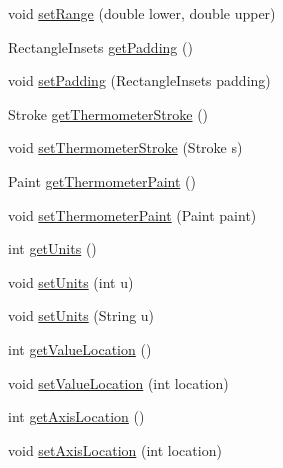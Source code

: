 \begin{DoxyCompactItemize}
void \mbox{\hyperlink{classorg_1_1jfree_1_1chart_1_1plot_1_1_thermometer_plot_aea60c0178fc6d469fe63bbf5fadf4c4c}{set\+Range}} (double lower, double upper)
\item 
Rectangle\+Insets \mbox{\hyperlink{classorg_1_1jfree_1_1chart_1_1plot_1_1_thermometer_plot_ae13b7526bb60e9b130430b510bd39d49}{get\+Padding}} ()
\item 
void \mbox{\hyperlink{classorg_1_1jfree_1_1chart_1_1plot_1_1_thermometer_plot_aca84c9a7372af7b31ae1845629f22c15}{set\+Padding}} (Rectangle\+Insets padding)
\item 
Stroke \mbox{\hyperlink{classorg_1_1jfree_1_1chart_1_1plot_1_1_thermometer_plot_a88292665456e7753129e4fa88053ef07}{get\+Thermometer\+Stroke}} ()
\item 
void \mbox{\hyperlink{classorg_1_1jfree_1_1chart_1_1plot_1_1_thermometer_plot_aaa2d0470bf85ee2eee9ea9e7568d919b}{set\+Thermometer\+Stroke}} (Stroke s)
\item 
Paint \mbox{\hyperlink{classorg_1_1jfree_1_1chart_1_1plot_1_1_thermometer_plot_ac725954b0973477c957c51b0e359fcda}{get\+Thermometer\+Paint}} ()
\item 
void \mbox{\hyperlink{classorg_1_1jfree_1_1chart_1_1plot_1_1_thermometer_plot_a3d8ade5824212540094354b9794b0dba}{set\+Thermometer\+Paint}} (Paint paint)
\item 
int \mbox{\hyperlink{classorg_1_1jfree_1_1chart_1_1plot_1_1_thermometer_plot_a69a0570b65093596ac626a988a3bcdbf}{get\+Units}} ()
\item 
void \mbox{\hyperlink{classorg_1_1jfree_1_1chart_1_1plot_1_1_thermometer_plot_a854875ffe9c0e66313089d022effdd44}{set\+Units}} (int u)
\item 
void \mbox{\hyperlink{classorg_1_1jfree_1_1chart_1_1plot_1_1_thermometer_plot_a510997aa0dd8f93a502f50fa1e197bde}{set\+Units}} (String u)
\item 
int \mbox{\hyperlink{classorg_1_1jfree_1_1chart_1_1plot_1_1_thermometer_plot_af9f80a7ccdea70b850b1383f078f25f0}{get\+Value\+Location}} ()
\item 
void \mbox{\hyperlink{classorg_1_1jfree_1_1chart_1_1plot_1_1_thermometer_plot_a2fadf1eca00d2d862890a047f5a8a46d}{set\+Value\+Location}} (int location)
\item 
int \mbox{\hyperlink{classorg_1_1jfree_1_1chart_1_1plot_1_1_thermometer_plot_a7d7e825ca604808c95356ca8859f849f}{get\+Axis\+Location}} ()
\item 
void \mbox{\hyperlink{classorg_1_1jfree_1_1chart_1_1plot_1_1_thermometer_plot_a8d5206541bc648f7cc920b5183d38aa2}{set\+Axis\+Location}} (int location)

\end{DoxyCompactItemize}
